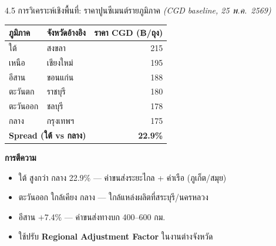 \documentclass[aspectratio=169,11pt]{beamer}
\begin{document}
\begin{frame}{4.5 การวิเคราะห์เชิงพื้นที่: ราคาปูนซีเมนต์รายภูมิภาค}
  \scriptsize
  \textit{(CGD baseline, 25 พ.ค.~2569)}
  \begin{table}
    \centering
    \begin{tabularx}{\textwidth}{l X r}
      \toprule
      \textbf{ภูมิภาค} & \textbf{จังหวัดอ้างอิง} & \textbf{ราคา CGD (฿/ถุง)} \\
      \midrule
      ใต้           & สงขลา      & 215 \\
      เหนือ         & เชียงใหม่   & 195 \\
      อีสาน         & ขอนแก่น    & 188 \\
      ตะวันตก       & ราชบุรี    & 180 \\
      ตะวันออก      & ชลบุรี     & 178 \\
      กลาง          & กรุงเทพฯ   & 175 \\
      \midrule
      \multicolumn{2}{l}{\textbf{Spread (ใต้ vs กลาง)}} & \textbf{22.9\%} \\
      \bottomrule
    \end{tabularx}
  \end{table}
  \textbf{การตีความ}
  \begin{itemize}
    \item ใต้ สูงกว่า กลาง 22.9\% --- ค่าขนส่งระยะไกล + ค่าเรือ (ภูเก็ต/สมุย)
    \item ตะวันออก ใกล้เคียง กลาง --- ใกล้แหล่งผลิตที่สระบุรี/นครหลวง
    \item อีสาน $+$7.4\% --- ค่าขนส่งทางบก 400--600 กม.
    \item ใช้ปรับ \textbf{Regional Adjustment Factor} ในงานต่างจังหวัด
  \end{itemize}
\end{frame}
\end{document}
